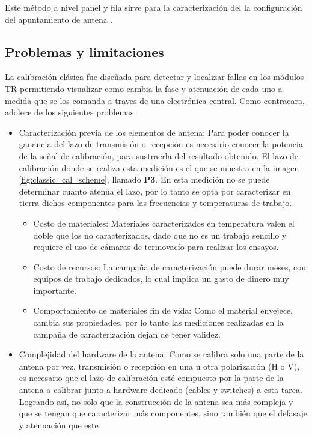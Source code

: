 Este método a nivel panel y fila sirve para la caracterización del la configuración del apuntamiento de antena \cite{Br2007}.

\subsection{Problemas y limitaciones}

La calibración clásica fue diseñada para detectar y localizar fallas en los módulos TR permitiendo visualizar como cambia la
fase y atenuación de cada uno a medida que se los comanda a traves de una electrónica central. Como contracara, adolece de
los siguientes problemas:

\begin{itemize}
	\item Caracterización previa de los elementos de antena: Para poder conocer la ganancia del lazo de transmisión o recepción
es necesario conocer la potencia de la señal de calibración, para sustraerla del resultado obtenido. El lazo de calibración
donde se realiza esta medición es el que se muestra en la imagen \ref{fig:classic_cal_scheme}, llamado \textbf{P3}. En esta
medición no se puede determinar cuanto atenúa el lazo, por lo tanto se opta por caracterizar en tierra dichos componentes
para las frecuencias y temperaturas de trabajo.
	\begin{itemize}
		\item Costo de materiales: Materiales caracterizados en temperatura valen el doble que los no caracterizados, 
			dado que no es un trabajo sencillo y requiere el uso de cámaras de termovacío para realizar los ensayos.
		\item Costo de recursos: La campaña de caracterización puede durar meses, con equipos de trabajo dedicados, lo cual implica
			un gasto de dinero muy importante.
		\item Comportamiento de materiales fin de vida: Como el material envejece, cambia sus propiedades, por lo tanto las mediciones realizadas
			en la campaña de caracterización dejan de tener validez.
	\end{itemize}
	\item Complejidad del hardware de la antena: Como se calibra solo una parte de la antena por vez, transmisión o recepción en
		una u otra polarización (H o V), es necesario que el lazo de calibración esté compuesto por la parte de la antena a
		calibrar junto a hardware dedicado (cables y switches) a esta tarea. Logrando así, no solo que la construcción de la antena
		sea más compleja y que se tengan que caracterizar más componentes, sino también que el defasaje y atenuación que este

\end{itemize}
